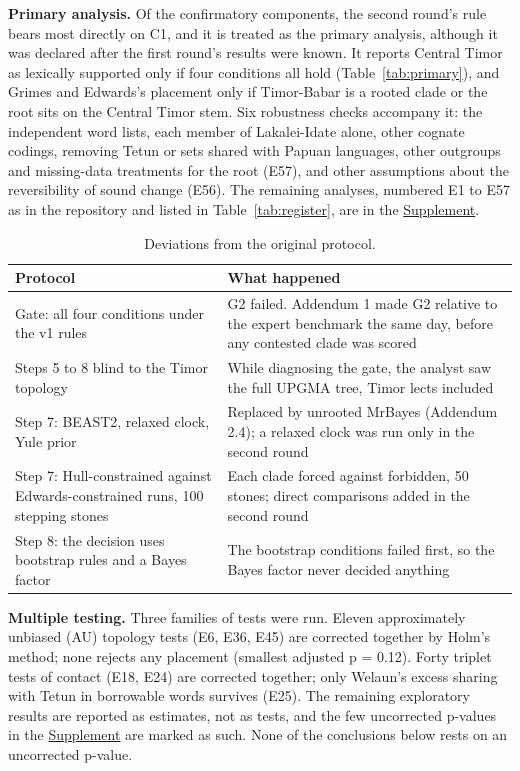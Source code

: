 \documentclass[11pt]{article}
\newcommand{\hd}[1]{\begin{minipage}[b]{\linewidth}\raggedright #1\end{minipage}}
\begin{document}
\textbf{Primary analysis.} Of the confirmatory components, the second round's rule bears most directly on C1, and it is treated as the primary analysis, although it was declared after the first round's results were known. It reports Central Timor as lexically supported only if four conditions all hold (Table~\ref{tab:primary}), and Grimes and Edwards's placement only if Timor-Babar is a rooted clade or the root sits on the Central Timor stem. Six robustness checks accompany it: the independent word lists, each member of Lakalei-Idate alone, other cognate codings, removing Tetun or sets shared with Papuan languages, other outgroups and missing-data treatments for the root (E57), and other assumptions about the reversibility of sound change (E56). The remaining analyses, numbered E1 to E57 as in the repository and listed in Table~\ref{tab:register}, are in the \hyperref[supplement]{Supplement}.

\begin{table}[tbp]
\caption{Deviations from the original protocol.}
\label{tab:deviations}
\begin{tabularx}{\linewidth}{@{}L{0.766}L{1.234}@{}}
\toprule
\hd{Protocol} & \hd{What happened} \\
\midrule
Gate: all four conditions under the v1 rules & G2 failed. Addendum 1 made G2 relative to the expert benchmark the same day, before any contested clade was scored \\
Steps 5 to 8 blind to the Timor topology & While diagnosing the gate, the analyst saw the full UPGMA tree, Timor lects included \\
Step 7: BEAST2, relaxed clock, Yule prior & Replaced by unrooted MrBayes (Addendum 2.4); a relaxed clock was run only in the second round \\
Step 7: Hull-constrained against Edwards-constrained runs, 100 stepping stones & Each clade forced against forbidden, 50 stones; direct comparisons added in the second round \\
Step 8: the decision uses bootstrap rules and a Bayes factor & The bootstrap conditions failed first, so the Bayes factor never decided anything \\
\bottomrule
\end{tabularx}
\end{table}

\textbf{Multiple testing.} Three families of tests were run. Eleven approximately unbiased (AU) topology tests (E6, E36, E45) are corrected together by Holm's \citeyearpar{holm1979} method; none rejects any placement (smallest adjusted p = 0.12). Forty triplet tests of contact (E18, E24) are corrected together; only Welaun's excess sharing with Tetun in borrowable words survives (E25). The remaining exploratory results are reported as estimates, not as tests, and the few uncorrected p-values in the \hyperref[supplement]{Supplement} are marked as such. None of the conclusions below rests on an uncorrected p-value.
\end{document}
